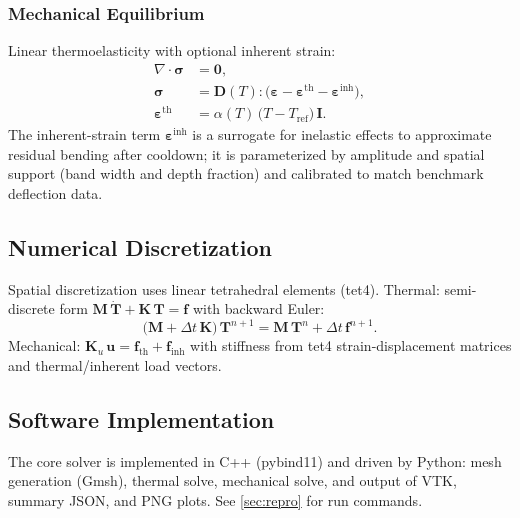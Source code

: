 \subsubsection{Mechanical Equilibrium}
Linear thermoelasticity with optional inherent strain:
\begin{align}
\nabla \cdot \boldsymbol{\sigma} &= \mathbf{0}, \\
\boldsymbol{\sigma} &= \mathbf{D}(T):\bigl(\boldsymbol{\varepsilon}-\boldsymbol{\varepsilon}^{\mathrm{th}}-\boldsymbol{\varepsilon}^{\mathrm{inh}}\bigr), \\
\boldsymbol{\varepsilon}^{\mathrm{th}} &= \alpha(T)\,\bigl(T - T_{\mathrm{ref}}\bigr)\,\mathbf{I}.
\end{align}
The inherent-strain term $\boldsymbol{\varepsilon}^{\mathrm{inh}}$ is a surrogate for inelastic effects to approximate residual bending after cooldown; it is parameterized by amplitude and spatial support (band width and depth fraction) and calibrated to match benchmark deflection data.

\subsection{Numerical Discretization}
Spatial discretization uses linear tetrahedral elements (tet4). Thermal: semi-discrete form $\mathbf{M}\,\dot{\mathbf{T}} + \mathbf{K}\,\mathbf{T} = \mathbf{f}$ with backward Euler:
\begin{equation}
\bigl(\mathbf{M} + \Delta t\,\mathbf{K}\bigr)\,\mathbf{T}^{n+1} = \mathbf{M}\,\mathbf{T}^{n} + \Delta t\,\mathbf{f}^{n+1}.
\end{equation}
Mechanical: $\mathbf{K}_u\,\mathbf{u} = \mathbf{f}_{\mathrm{th}} + \mathbf{f}_{\mathrm{inh}}$ with stiffness from tet4 strain-displacement matrices and thermal/inherent load vectors.

\subsection{Software Implementation}
The core solver is implemented in C++ (pybind11) and driven by Python: mesh generation (Gmsh), thermal solve, mechanical solve, and output of VTK, summary JSON, and PNG plots. See \cref{sec:repro} for run commands.
